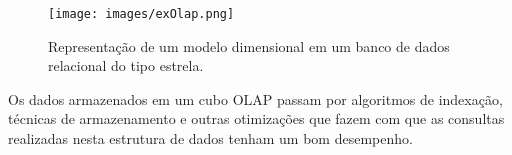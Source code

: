 \begin{figure}[h]
	\center
	\texttt{[image: images/exOlap.png]}
	\label{fig:exOlap}
	\caption{Representação de um modelo dimensional em um banco de dados relacional do tipo estrela.}
\end{figure}

Os dados armazenados em um cubo OLAP passam por algoritmos de indexação, técnicas de armazenamento e outras otimizações que fazem com que as consultas realizadas nesta estrutura de dados tenham um bom desempenho. 
 




















